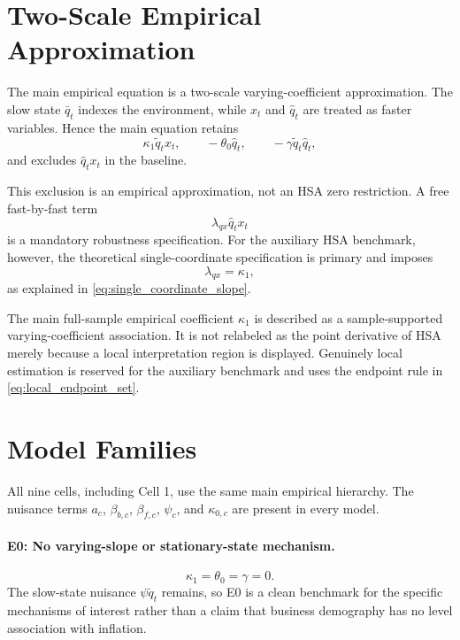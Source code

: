\documentclass[11pt]{article}
\begin{document}
\section{Two-Scale Empirical Approximation}

The main empirical equation is a two-scale varying-coefficient approximation. The slow state $\bar q_t$ indexes the environment, while $x_t$ and $\hat q_t$ are treated as faster variables. Hence the main equation retains
\begin{equation}
\kappa_1\tilde q_tx_t,
\qquad
-\theta_0\hat q_t,
\qquad
-\gamma\tilde q_t\hat q_t,
\end{equation}
and excludes $\hat q_tx_t$ in the baseline.

This exclusion is an empirical approximation, not an HSA zero restriction. A free fast-by-fast term
\begin{equation}
\lambda_{qx}\hat q_tx_t
\end{equation}
is a mandatory robustness specification. For the auxiliary HSA benchmark, however, the theoretical single-coordinate specification is primary and imposes
\begin{equation}
\lambda_{qx}=\kappa_1,
\end{equation}
as explained in \cref{eq:single_coordinate_slope}.

The main full-sample empirical coefficient $\kappa_1$ is described as a sample-supported varying-coefficient association. It is not relabeled as the point derivative of HSA merely because a local interpretation region is displayed. Genuinely local estimation is reserved for the auxiliary benchmark and uses the endpoint rule in \cref{eq:local_endpoint_set}.

\section{Model Families}

All nine cells, including Cell 1, use the same main empirical hierarchy. The nuisance terms $a_c$, $\beta_{b,c}$, $\beta_{f,c}$, $\psi_c$, and $\kappa_{0,c}$ are present in every model.

\paragraph{E0: No varying-slope or stationary-state mechanism.}
\begin{equation}
\kappa_1=\theta_0=\gamma=0.
\end{equation}
The slow-state nuisance $\psi\tilde q_t$ remains, so E0 is a clean benchmark for the specific mechanisms of interest rather than a claim that business demography has no level association with inflation.
\end{document}
